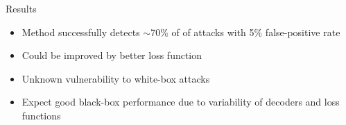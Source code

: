 \documentclass{beamer}
\begin{document}
	\begin{frame}{Results}
		\begin{itemize}
			\item Method successfully detects $\sim$70\% of of attacks with 5\% false-positive rate
			\item Could be improved by better loss function
			\item Unknown vulnerability to white-box attacks
			\item Expect good black-box performance due to variability of decoders and loss functions
		\end{itemize}
	\end{frame}
	
	

	
\end{document}
